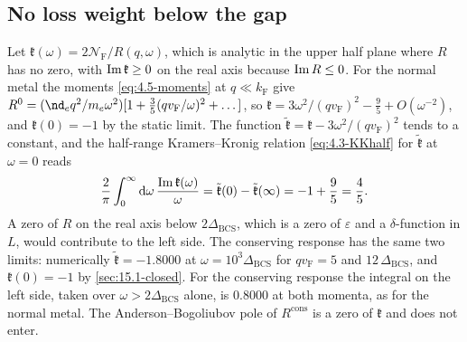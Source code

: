 \subsection*{No loss weight below the gap}

Let $\mathfrak{k}(\omega) = 2\mathcal{N}_{\mathrm{F}}/R(q,\omega)$, which is analytic in the upper half plane where $R$ has no zero, with $\operatorname{Im}\mathfrak{k} \ge 0$ on the real axis because $\operatorname{Im} R \le 0$. For the normal metal the moments \cref{eq:4.5-moments} at $q \ll k_{\mathrm{F}}$ give $R^0 = (\nd_eq^2/m_e\omega^2)[1 + \frac35(qv_{\mathrm{F}}/\omega)^2 + \dots]$, so $\mathfrak{k} = 3\omega^2/(qv_{\mathrm{F}})^2 - \frac95 + O(\omega^{-2})$, and $\mathfrak{k}(0) = -1$ by the static limit. The function $\tilde{\mathfrak{k}} = \mathfrak{k} - 3\omega^2/(qv_{\mathrm{F}})^2$ tends to a constant, and the half-range Kramers--Kronig relation \cref{eq:4.3-KKhalf} for $\tilde{\mathfrak{k}}$ at $\omega = 0$ reads
\begin{equation*}
  \frac{2}{\pi}\int_0^\infty\mathrm{d}\omega\,\frac{\operatorname{Im}\mathfrak{k}(\omega)}{\omega} = \tilde{\mathfrak{k}}(0) - \tilde{\mathfrak{k}}(\infty) = -1 + \frac95 = \frac45 .
\end{equation*}
A zero of $R$ on the real axis below $2\Delta_{\mathrm{BCS}}$, which is a zero of $\varepsilon$ and a $\delta$-function in $L$, would contribute to the left side. The conserving response has the same two limits: numerically $\tilde{\mathfrak{k}} = -1.8000$ at $\omega = 10^3\Delta_{\mathrm{BCS}}$ for $qv_{\mathrm{F}} = 5$ and $12\,\Delta_{\mathrm{BCS}}$, and $\mathfrak{k}(0) = -1$ by \cref{sec:15.1-closed}. For the conserving response the integral on the left side, taken over $\omega > 2\Delta_{\mathrm{BCS}}$ alone, is 0.8000 at both momenta, as for the normal metal. The Anderson--Bogoliubov pole of $R^{\mathrm{cons}}$ is a zero of $\mathfrak{k}$ and does not enter.
